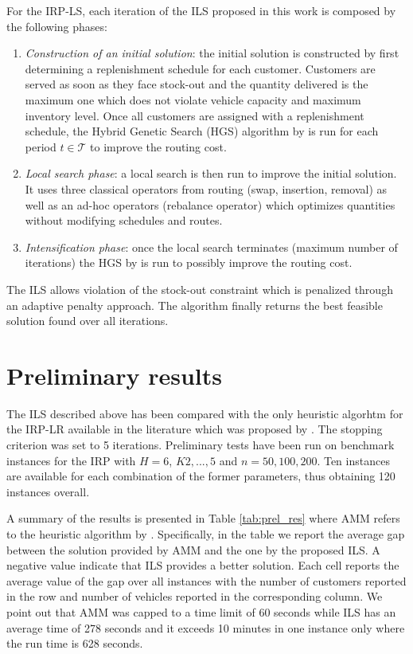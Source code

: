 \documentclass{article}
\begin{document}
For the IRP-LS, each iteration of the ILS proposed in this work is composed by the following phases:

\begin{enumerate}
    \item \textit{Construction of an initial solution}: the initial solution is constructed by first determining a replenishment schedule for each customer. Customers are served as soon as they face stock-out and the quantity delivered is the maximum one which does not violate vehicle capacity and maximum inventory level. Once all customers are assigned with a replenishment schedule, the Hybrid Genetic Search (HGS) algorithm by \cite{vidal2022hybrid} is run for each period $t \in \mathcal{T}$ to improve the routing cost.
    \item \textit{Local search phase}: a local search is then run to improve the initial solution. It uses three classical operators from routing (swap, insertion, removal) as well as an ad-hoc operators (rebalance operator) which optimizes quantities without modifying schedules and routes.
    \item \textit{Intensification phase}: once the local search terminates (maximum number of iterations) the HGS by \cite{vidal2022hybrid} is run to possibly improve the routing cost.
\end{enumerate}

The ILS allows violation of the stock-out constraint which is penalized through an adaptive penalty approach. The algorithm finally returns the best feasible solution found over all iterations.

\section{Preliminary results}

The ILS described above has been compared with the only heuristic algorhtm for the IRP-LR available in the literature which was proposed by \cite{alvarez2018iterated}. The stopping criterion was set to 5 iterations. Preliminary tests have been run on benchmark instances for the IRP with $H=6$, $K2,...,5$ and $n=50,100,200$. Ten instances are available for each combination of the former parameters, thus obtaining  120 instances overall.

A summary of the results is presented in Table \ref{tab:prel_res} where AMM refers to the heuristic algorithm by \cite{alvarez2018iterated}. Specifically, in the table we report the average gap between the solution provided by AMM and the one by the proposed ILS. A negative value indicate that ILS provides a better solution. Each cell reports the average value of the gap over all instances with the number of customers reported in the row and number of vehicles reported in the corresponding column. We point out that AMM was capped to a time limit of 60 seconds while ILS has an average time of 278 seconds and it exceeds 10 minutes in one instance only where the run time is 628 seconds. 
\end{document}
